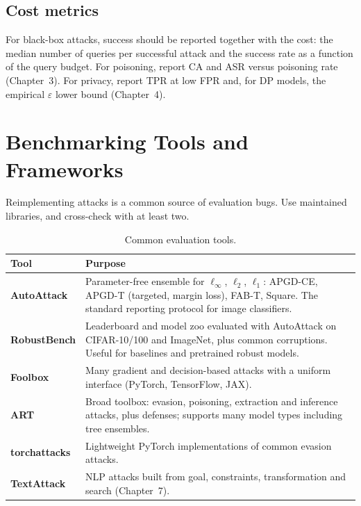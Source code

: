 \documentclass[10pt,a4paper]{extarticle}
\theoremstyle{definition}
\begin{document}
\subsection{Cost metrics}

For black-box attacks, success should be reported together with the cost: the median number of queries per successful attack and the success rate as a function of the query budget. For poisoning, report CA and ASR versus poisoning rate (Chapter~3). For privacy, report TPR at low FPR and, for DP models, the empirical \(\varepsilon\) lower bound (Chapter~4).

\section{Benchmarking Tools and Frameworks}

Reimplementing attacks is a common source of evaluation bugs. Use maintained libraries, and cross-check with at least two.

\begin{table}[h]
\centering\small
\begin{tabularx}{\textwidth}{>{\bfseries}l X}
\toprule
Tool & Purpose \\
\midrule
AutoAttack \citep{croce2020reliable} & Parameter-free ensemble for \(\ell_\infty\), \(\ell_2\), \(\ell_1\): APGD-CE, APGD-T (targeted, margin loss), FAB-T, Square. The standard reporting protocol for image classifiers. \\
RobustBench \citep{croce2021robustbench} & Leaderboard and model zoo evaluated with AutoAttack on CIFAR-10/100 and ImageNet, plus common corruptions. Useful for baselines and pretrained robust models. \\
Foolbox \citep{rauber2020foolbox} & Many gradient and decision-based attacks with a uniform interface (PyTorch, TensorFlow, JAX). \\
ART \citep{nicolae2018art} & Broad toolbox: evasion, poisoning, extraction and inference attacks, plus defenses; supports many model types including tree ensembles. \\
torchattacks \citep{kim2020torchattacks} & Lightweight PyTorch implementations of common evasion attacks. \\
TextAttack \citep{morris2020textattack} & NLP attacks built from goal, constraints, transformation and search (Chapter~7). \\
\bottomrule
\end{tabularx}
\caption{Common evaluation tools.}
\end{table}
\end{document}
